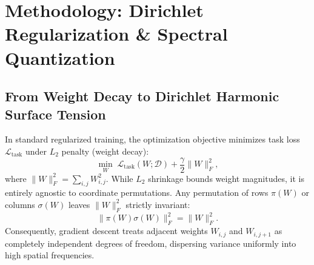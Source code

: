 \documentclass[11pt,a4paper]{article}
\begin{document}
\section{Methodology: Dirichlet Regularization \& Spectral Quantization}
\label{sec:method}

\subsection{From Weight Decay to Dirichlet Harmonic Surface Tension}
In standard regularized training, the optimization objective minimizes task loss $\mathcal{L}_{\text{task}}$ under $L_2$ penalty (weight decay):
\begin{equation}
    \min_{W} \; \mathcal{L}_{\text{task}}(W; \mathcal{D}) + \frac{\gamma}{2} \|W\|_F^2,
\end{equation}
where $\|W\|_F^2 = \sum_{i,j} W_{i,j}^2$. While $L_2$ shrinkage bounds weight magnitudes, it is entirely agnostic to coordinate permutations. Any permutation of rows $\pi(W)$ or columns $\sigma(W)$ leaves $\|W\|_F^2$ strictly invariant:
\begin{equation}
    \|\pi(W)\sigma(W)\|_F^2 = \|W\|_F^2.
\end{equation}
Consequently, gradient descent treats adjacent weights $W_{i, j}$ and $W_{i, j+1}$ as completely independent degrees of freedom, dispersing variance uniformly into high spatial frequencies.
\end{document}
